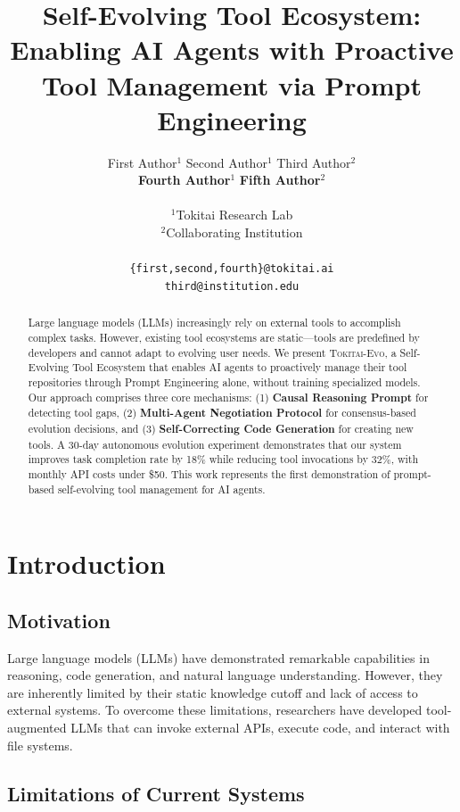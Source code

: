 \documentclass[11pt]{article}
\title{Self-Evolving Tool Ecosystem: Enabling AI Agents with Proactive Tool Management via Prompt Engineering}
\author{
  First Author$^1$ \quad Second Author$^1$ \quad Third Author$^2$ \\
  \textbf{Fourth Author}$^1$ \quad \textbf{Fifth Author}$^2$ \\
  \\
  $^1$Tokitai Research Lab \\
  $^2$Collaborating Institution \\
  \\
  \texttt{\{first,second,fourth\}@tokitai.ai} \\
  \texttt{third@institution.edu}
}
\date{}
\newcommand{\ours}{\textsc{Tokitai-Evo}\xspace}
\begin{document}
\maketitle

\begin{abstract}
Large language models (LLMs) increasingly rely on external tools to accomplish complex tasks. However, existing tool ecosystems are static---tools are predefined by developers and cannot adapt to evolving user needs. We present \ours, a Self-Evolving Tool Ecosystem that enables AI agents to proactively manage their tool repositories through Prompt Engineering alone, without training specialized models. Our approach comprises three core mechanisms: (1) \textbf{Causal Reasoning Prompt} for detecting tool gaps, (2) \textbf{Multi-Agent Negotiation Protocol} for consensus-based evolution decisions, and (3) \textbf{Self-Correcting Code Generation} for creating new tools. A 30-day autonomous evolution experiment demonstrates that our system improves task completion rate by 18\% while reducing tool invocations by 32\%, with monthly API costs under \$50. This work represents the first demonstration of prompt-based self-evolving tool management for AI agents.
\end{abstract}

\section{Introduction}\label{sec:intro}

\subsection{Motivation}

Large language models (LLMs) have demonstrated remarkable capabilities in reasoning, code generation, and natural language understanding. However, they are inherently limited by their static knowledge cutoff and lack of access to external systems. To overcome these limitations, researchers have developed tool-augmented LLMs that can invoke external APIs, execute code, and interact with file systems.

\subsection{Limitations of Current Systems}
\end{document}
